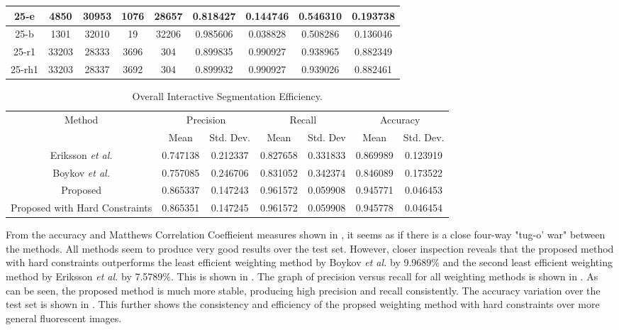 \begin{longtable}[!h]{|c|c|c|c|c|c|c|c|c|}
	\hline	25-e	&	4850	&	30953	&	1076	&	28657	&	0.818427	&	0.144746	&	0.546310	&	0.193738	\\
	\hline \rowcolor{bad}	25-b	&	1301	&	32010	&	19	&	32206	&	0.985606	&	0.038828	&	0.508286	&	0.136046	\\
	\hline	25-r1	&	33203	&	28333	&	3696	&	304	&	0.899835	&	0.990927	&	0.938965	&	0.882349	\\
	\hline \rowcolor{closest}	25-rh1	&	33203	&	28337	&	3692	&	304	&	0.899932	&	0.990927	&	0.939026	&	0.882461	\\
	\hline 
\end{longtable} 

\begin{longtable}[!h]{|c|c|c|c|c|c|c|}
	\caption{Overall Interactive Segmentation Efficiency.} \label{tab:overallinteractivesegmentationefficiency}\\
	\hline 
	\multirow{2}{*}{Method} & \multicolumn{2}{c|}{Precision} & \multicolumn{2}{c|}{Recall} & \multicolumn{2}{c|}{Accuracy} \\ 
	\hhline{~------}
	& Mean & Std. Dev. & Mean & Std. Dev & Mean & Std. Dev.  \\ 
	\hline	Eriksson \textit{et al.}	&	0.747138	&	0.212337	&	0.827658	&	0.331833	&	0.869989	&	0.123919	\\
	\hline \rowcolor{bad}	Boykov \textit{et al.}	&	0.757085	&	0.246706	&	0.831052	&	0.342374	&	0.846089	&	0.173522	\\
	\hline	Proposed	&	0.865337	&	0.147243	&	0.961572	&	0.059908	&	0.945771	&	0.046453	\\
	\hline \rowcolor{closest}	Proposed with Hard Constraints	&	0.865351	&	0.147245	&	0.961572	&	0.059908	&	0.945778	&	0.046454	\\	
	\hline
\end{longtable}

From the accuracy and Matthews Correlation Coeffieient measures shown in , it seems as if there is a close four-way "tug-o' war" between the methods. All methods seem to produce very good results over the test set. However, closer inspection reveals that the proposed method with hard constraints outperforms the least efficient weighting method by Boykov \textit{et al.} by 9.9689\% and the second least efficient weighting method by Eriksson \textit{et al.} by 7.5789\%. This is shown in . The graph of precision versus recall for all weighting methods is shown in . As can be seen, the proposed method is much more stable, producing high precision and recall consistently. The accuracy variation over the test set is shown in . This further shows the consistency and efficiency of the propsed weighting method with hard constraints over more general fluorescent images.

